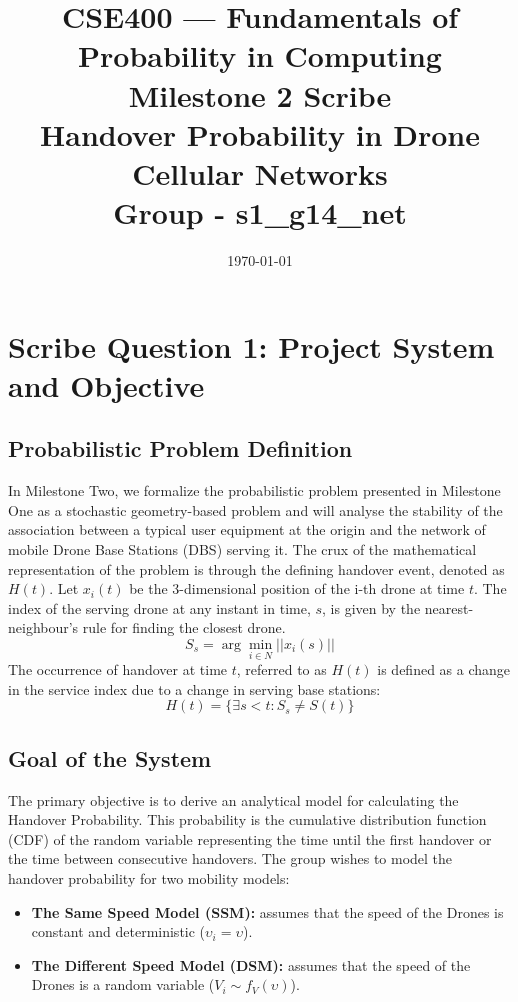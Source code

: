 \documentclass[12pt,a4paper]{article}
\title{CSE400 --- Fundamentals of Probability in Computing\\
Milestone 2 Scribe\\
Handover Probability in Drone Cellular Networks\\ 
Group  -  s1\_g14\_net}
\date{\today}
\begin{document}
\maketitle
\thispagestyle{empty}

\newpage
\setcounter{page}{1}

   \section*{Scribe Question 1: Project System and Objective} %

   \subsection*{Probabilistic Problem Definition} %
In Milestone Two, we formalize the probabilistic problem presented in Milestone One as a stochastic geometry-based problem and will analyse the stability of the association between a typical user equipment at the origin and the network of mobile Drone Base Stations (DBS) serving it.    %
The crux of the mathematical representation of the problem is through the defining handover event, denoted as $H(t)$.    %
Let $x_i(t)$ be the 3-dimensional position of the i-th drone at time $t$.    %
The index of the serving drone at any instant in time, $s$, is given by the nearest-neighbour's rule for finding the closest drone.    %
   $$S_s = \arg \min_{i\in N} ||x_i(s)||$$ %
   The occurrence of handover at time $t$, referred to as $H(t)$ is defined as a change in the service index due to a change in serving base stations: %
   $$H(t) = \{\exists s < t : S_s \neq S(t)\}$$ %

   \subsection*{Goal of the System} %
The primary objective is to derive an analytical model for calculating the Handover Probability.    %
This probability is the cumulative distribution function (CDF) of the random variable representing the time until the first handover or the time between consecutive handovers.    %
   The group wishes to model the handover probability for two mobility models: %
\begin{itemize}
    \item \textbf{The Same Speed Model (SSM):} assumes that the speed of the Drones is constant and deterministic ($\upsilon_i = \upsilon$).    %
    \item \textbf{The Different Speed Model (DSM):} assumes that the speed of the Drones is a random variable ($V_i \sim f_V(\upsilon)$).    %
\end{itemize}
\end{document}
